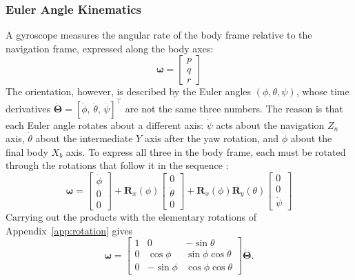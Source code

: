 \documentclass[12pt,a4paper]{article}
\newcommand{\bomega}{\bm{\omega}}
\newcommand{\bTheta}{\bm{\Theta}}
\begin{document}
\subsubsection{Euler Angle Kinematics}
\label{sec:euler-kinematics}

A gyroscope measures the angular rate of the body frame relative to
the navigation frame, expressed along the body axes:
\begin{equation}
  \bomega = \begin{bmatrix} p \\ q \\ r \end{bmatrix}
  \label{eq:omega_body}
\end{equation}
The orientation, however, is described by the Euler angles
$(\phi,\theta,\psi)$, whose time derivatives
$\dot{\bTheta} = [\dot{\phi},\,\dot{\theta},\,\dot{\psi}]^{\top}$
are not the same three numbers. The reason is that each Euler angle
rotates about a different axis: $\dot{\psi}$ acts about the
navigation $Z_n$ axis, $\dot{\theta}$ about the intermediate $Y$
axis after the yaw rotation, and $\dot{\phi}$ about the final body
$X_b$ axis. To express all three in the body frame, each must be
rotated through the rotations that follow it in the sequence
\citep{groves2013principles}:
\begin{equation}
  \bomega =
  \begin{bmatrix} \dot{\phi} \\ 0 \\ 0 \end{bmatrix}
  + \bm{R}_x(\phi)\begin{bmatrix} 0 \\ \dot{\theta} \\ 0 \end{bmatrix}
  + \bm{R}_x(\phi)\bm{R}_y(\theta)\begin{bmatrix} 0 \\ 0 \\ \dot{\psi} \end{bmatrix}
  \label{eq:omega_from_euler}
\end{equation}
Carrying out the products with the elementary rotations of
Appendix~\ref{app:rotation} gives
\begin{equation}
  \bomega =
  \begin{bmatrix}
    1 & 0 & -\sin\theta \\
    0 & \cos\phi & \sin\phi\cos\theta \\
    0 & -\sin\phi & \cos\phi\cos\theta
  \end{bmatrix}
  \dot{\bTheta}.
  \label{eq:euler_to_body}
\end{equation}
\end{document}
